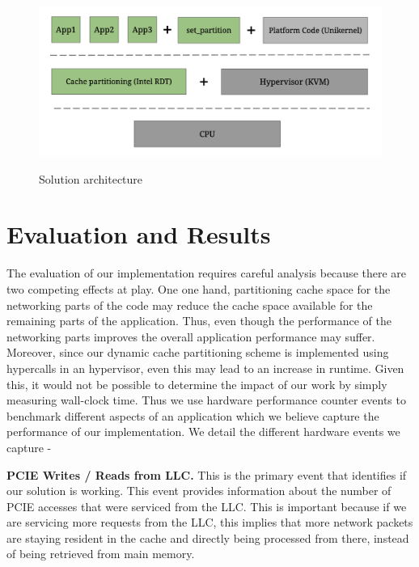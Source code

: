 \documentclass[sigconf]{acmart}
\begin{document}
\begin{figure}[h]
  \centering
  \includegraphics[width=\linewidth]{solution_architecture}
    \label{fig:solution}
    \caption{Solution architecture}
\end{figure}

\section{Evaluation and Results}

The evaluation of our implementation requires careful analysis because there are
two competing effects at play. One one hand, partitioning cache space for the
networking parts of the code may reduce the cache space available for the
remaining parts of the application. Thus, even though the performance of the
networking parts improves the overall application performance may suffer.
Moreover, since our dynamic cache partitioning scheme is implemented using
hypercalls in an hypervisor, even this may lead to an increase in runtime. Given
this, it would not be possible to determine the impact of our work by simply
measuring wall-clock time. Thus we use hardware performance counter events to
benchmark different aspects of an application which we believe capture the
performance of our implementation. We detail the different hardware events we
capture -

\textbf{PCIE Writes / Reads from LLC.} This is the primary event that identifies
if our solution is working. This event provides information about the number of
PCIE accesses that were serviced from the LLC. This is important because if we
are servicing more requests from the LLC, this implies that more network packets
are staying resident in the cache and directly being processed from there,
instead of being retrieved from main memory.
\end{document}
